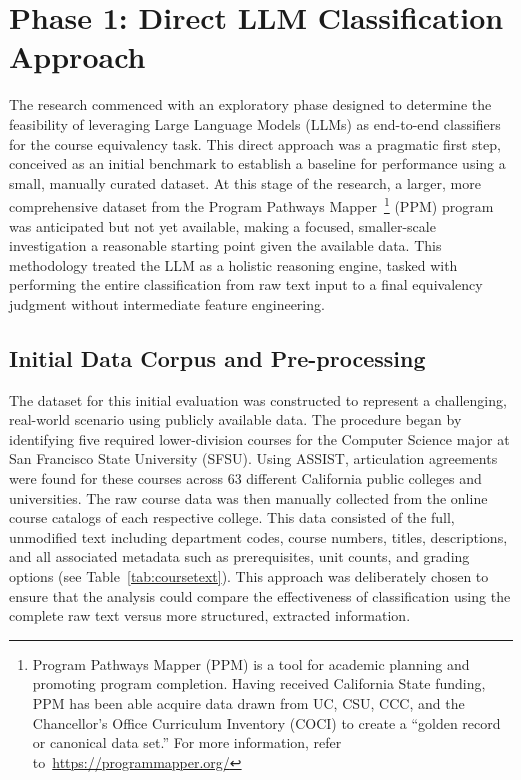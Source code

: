 \section{Phase 1: Direct LLM Classification Approach}\label{ch:3.1}
The research commenced with an exploratory phase designed to determine the feasibility of leveraging Large Language Models (LLMs) as end-to-end classifiers for the course equivalency task. This direct approach was a pragmatic first step, conceived as an initial benchmark to establish a baseline for performance using a small, manually curated dataset. At this stage of the research, a larger, more comprehensive dataset from the Program Pathways Mapper~\footnote{Program Pathways Mapper (PPM) is a tool for academic planning and promoting program completion.  Having received California State funding, PPM has been able acquire data drawn from UC, CSU, CCC, and the Chancellor’s Office Curriculum Inventory (COCI) to create a ``golden record or canonical data set.'' For more information, refer to~\url{https://programmapper.org/}} (PPM) program was anticipated but not yet available, making a focused, smaller-scale investigation a reasonable starting point given the available data. This methodology treated the LLM as a holistic reasoning engine, tasked with performing the entire classification from raw text input to a final equivalency judgment without intermediate feature engineering.

\subsection{Initial Data Corpus and Pre-processing}\label{ch:3.1.1}
The dataset for this initial evaluation was constructed to represent a challenging, real-world scenario using publicly available data. The procedure began by identifying five required lower-division courses for the Computer Science major at San Francisco State University (SFSU). Using ASSIST, articulation agreements were found for these courses across 63 different California public colleges and universities. The raw course data was then manually collected from the online course catalogs of each respective college. This data consisted of the full, unmodified text including department codes, course numbers, titles, descriptions, and all associated metadata such as prerequisites, unit counts, and grading options (see Table~\ref{tab:coursetext}). This approach was deliberately chosen to ensure that the analysis could compare the effectiveness of classification using the complete raw text versus more structured, extracted information.

